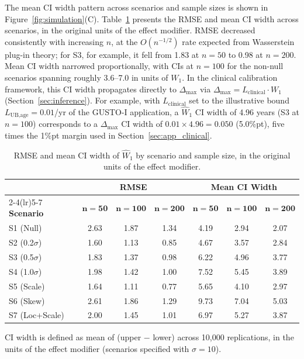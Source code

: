 \documentclass[AMA,Times1COL]{WileyNJDv5}
\begin{document}
The mean CI width pattern across scenarios and sample sizes is shown in Figure~\ref{fig:simulation}(C). Table~\ref{tab:precision} presents the RMSE and mean CI width across scenarios, in the original units of the effect modifier. RMSE decreased consistently with increasing $n$, at the $O(n^{-1/2})$ rate expected from Wasserstein plug-in theory; for S3, for example, it fell from 1.83 at $n=50$ to 0.98 at $n=200$. Mean CI width narrowed proportionally, with CIs at $n = 100$ for the non-null scenarios spanning roughly 3.6--7.0 in units of $W_1$. In the clinical calibration framework, this CI width propagates directly to $\Delta_{\max}$ via $\Delta_{\max} = L_{\text{clinical}} \cdot W_1$ (Section~\ref{sec:inference}). For example, with $L_{\text{clinical}}$ set to the illustrative bound $L_{\text{UB,age}} = 0.01$/yr of the GUSTO-I application, a $\widehat{W}_1$ CI width of 4.96 years (S3 at $n = 100$) corresponds to a $\Delta_{\max}$ CI width of $0.01 \times 4.96 = 0.050$ (5.0\%pt), five times the 1\%pt margin used in Section~\ref{sec:app_clinical}.

\begin{table}[ht]
\centering
\caption{RMSE and mean CI width of $\widehat{W}_1$ by scenario and sample size, in the original units of the effect modifier.\label{tab:precision}}
\begin{tabular}{lcccccc}
\toprule
& \multicolumn{3}{c}{\textbf{RMSE}} & \multicolumn{3}{c}{\textbf{Mean CI Width}} \\
\cmidrule(lr){2-4}\cmidrule(lr){5-7}
\textbf{Scenario} & $\boldsymbol{n=50}$ & $\boldsymbol{n=100}$ & $\boldsymbol{n=200}$ & $\boldsymbol{n=50}$ & $\boldsymbol{n=100}$ & $\boldsymbol{n=200}$ \\
\midrule
S1 (Null) & 2.63 & 1.87 & 1.34 & 4.19 & 2.94 & 2.07 \\
S2 (0.2$\sigma$) & 1.60 & 1.13 & 0.85 & 4.67 & 3.57 & 2.84 \\
S3 (0.5$\sigma$) & 1.83 & 1.37 & 0.98 & 6.22 & 4.96 & 3.77 \\
S4 (1.0$\sigma$) & 1.98 & 1.42 & 1.00 & 7.52 & 5.45 & 3.89 \\
S5 (Scale) & 1.64 & 1.11 & 0.77 & 5.65 & 4.10 & 2.97 \\
S6 (Skew) & 2.61 & 1.86 & 1.29 & 9.73 & 7.04 & 5.03 \\
S7 (Loc+Scale) & 2.00 & 1.45 & 1.01 & 6.97 & 5.27 & 3.87 \\
\bottomrule
\end{tabular}
\begin{tablenotes}
\item CI width is defined as mean of (upper $-$ lower) across 10{,}000 replications, in the units of the effect modifier (scenarios specified with $\sigma = 10$).
\end{tablenotes}
\end{table}
\end{document}
